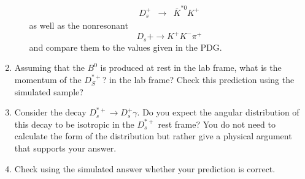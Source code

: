 \documentclass[12pt]{article}
\begin{document}
\begin{enumerate}
\begin{enumerate}
\begin{eqnarray*}
D_s^+ & \rightarrow &  \overline K^{*0}  K^+  
\end{eqnarray*}
as well as the nonresonant
$$
D_s+ \rightarrow K^+ K^- \pi^+
$$
and compare them to the values given in the PDG.
\end{enumerate}
\item Assuming that the $B^0$ is produced at rest in the lab frame, what is the momentum of the $D_S^{*+}$? in
the lab frame?  Check this prediction using the simulated sample?
\item Consider the decay $D_s^{*+} \rightarrow  D_s^+ \gamma$.  Do you expect the angular distribution of
  this decay to be isotropic in the $D_s^{*+}$ rest frame?  You do not need to calculate the form of
  the distribution but rather give a physical argument that supports your answer.
\item Check using the simulated answer whether your prediction is correct.
\end{enumerate}
\end{document}
